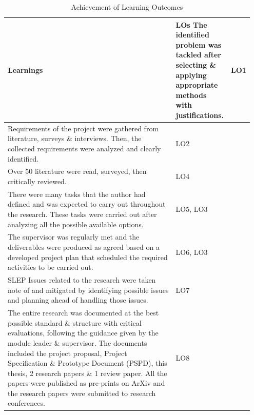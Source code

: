 \begin{longtable}{|p{0.8\linewidth}|p{0.1471\linewidth}|}
\caption{Achievement of Learning Outcomes}
\label{tab:achievement-learning-outcomes-table}
\\ 
\hline
\textbf{Learnings} & \textbf{LOs}\endfirsthead 
\hline
The identified problem was tackled after selecting \& applying appropriate methods with justifications. & LO1 \\
\hline
Requirements of the project were gathered from literature, surveys \& interviews. Then, the collected requirements were analyzed and clearly identified. & LO2 \\
\hline
Over 50 literature were read, surveyed, then critically reviewed. & LO4 \\
\hline
There were many tasks that the author had defined and was expected to carry out throughout the research. These tasks were carried out after analyzing all the possible available options. & LO5, LO3 \\
\hline
The supervisor was regularly met and the deliverables were produced as agreed based on a developed project plan that scheduled the required activities to be carried out. & LO6, LO3 \\
\hline
SLEP Issues related to the research were taken note of and mitigated by identifying possible issues and planning ahead of handling those issues. & LO7 \\
\hline
The entire research was documented at the best possible standard \& structure with critical evaluations, following the guidance given by the module leader \& supervisor. The documents included the project proposal, Project Specification \& Prototype Document (PSPD), this thesis, 2 research papers \& 1 review paper. All the papers were published as pre-prints on ArXiv and the research papers were submitted to research conferences. & LO8 \\
\hline
\end{longtable}
